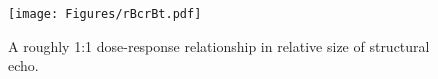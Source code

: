 \documentclass{article}
\newcommand\todo[1]{\textcolor{red}{[TODO: #1]}}
\begin{document}
\begin{figure}
\texttt{[image: Figures/rBcrBt.pdf]}
\caption{A roughly 1:1 dose-response relationship in relative size of structural echo.}
\label{fig:rBcrBt}
\end{figure}



\FloatBarrier

\singlespacing

   
  
\end{document}
